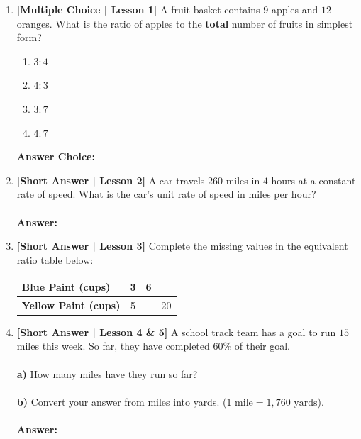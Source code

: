 \documentclass[12pt, letterpaper, fleqn]{article}
\newcommand{\blankshorter}{\underline{\hspace{2.0cm}}}
\newcommand{\blanklong}{\underline{\hspace{6.5cm}}}
\begin{document}
\begin{enumerate}[leftmargin=0.6cm, itemsep=0.8cm]

\item \textbf{[Multiple Choice | Lesson 1]} A fruit basket contains $9$ apples and $12$ oranges. What is the ratio of apples to the \textbf{total} number of fruits in simplest form?
\begin{enumerate}[label=\Alph*)]
    \item $3:4$
    \item $4:3$
    \item $3:7$
    \item $4:7$
\end{enumerate}
\textbf{Answer Choice:} \blankshorter

\item \textbf{[Short Answer | Lesson 2]} A car travels $260$ miles in $4$ hours at a constant rate of speed. What is the car's unit rate of speed in miles per hour?
\\ \\
\textbf{Answer:} \blanklong

\item \textbf{[Short Answer | Lesson 3]} Complete the missing values in the equivalent ratio table below:
\begin{center}
\renewcommand{\arraystretch}{1.3}
\begin{tabular}{|l|c|c|c|}
\hline
\textbf{Blue Paint (cups)} & 3 & 6 & \blankshorter \\ \hline
\textbf{Yellow Paint (cups)} & 5 & \blankshorter & 20 \\ \hline
\end{tabular}
\end{center}

\item \textbf{[Short Answer | Lesson 4 \& 5]} A school track team has a goal to run $15$ miles this week. So far, they have completed $60\%$ of their goal.
\\ \\
\textbf{a)} How many miles have they run so far? \blankshorter \\ \\
\textbf{b)} Convert your answer from miles into yards. ($1\text{ mile} = 1,760\text{ yards}$).
\\ \\
\textbf{Answer:} \blanklong

\end{enumerate}
\vspace{0.5cm}
\end{document}
